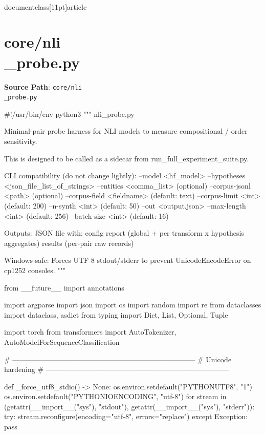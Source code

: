 \\documentclass[11pt]{article}
\begin{document}
\section*{core/nli\\_probe.py}
\textbf{Source Path}: \texttt{core/nli\\_probe.py}\par
\bigskip
\begin{CodeBlock}
#!/usr/bin/env python3
"""
nli_probe.py

Minimal-pair probe harness for NLI models to measure compositional / order sensitivity.

This is designed to be called as a sidecar from run_full_experiment_suite.py.

CLI compatibility (do not change lightly):
  --model <hf_model>
  --hypotheses <json_file_list_of_strings>
  --entities <comma_list>                 (optional)
  --corpus-jsonl <path>                   (optional)
  --corpus-field <fieldname>              (default: text)
  --corpus-limit <int>                    (default: 200)
  --n-synth <int>                         (default: 50)
  --out <output.json>
  --max-length <int>                      (default: 256)
  --batch-size <int>                      (default: 16)

Outputs:
  JSON file with:
    config
    report (global + per transform x hypothesis aggregates)
    results (per-pair raw records)

Windows-safe:
  Forces UTF-8 stdout/stderr to prevent UnicodeEncodeError on cp1252 consoles.
"""

from __future__ import annotations

import argparse
import json
import os
import random
import re
from dataclasses import dataclass, asdict
from typing import Dict, List, Optional, Tuple

import torch
from transformers import AutoTokenizer, AutoModelForSequenceClassification


# -----------------------------------------------------------------------------
# Unicode hardening
# -----------------------------------------------------------------------------

def _force_utf8_stdio() -> None:
    os.environ.setdefault("PYTHONUTF8", "1")
    os.environ.setdefault("PYTHONIOENCODING", "utf-8")
    for stream in (getattr(__import__("sys"), "stdout"), getattr(__import__("sys"), "stderr")):
        try:
            stream.reconfigure(encoding="utf-8", errors="replace")
        except Exception:
            pass



\end{CodeBlock}
\end{document}
